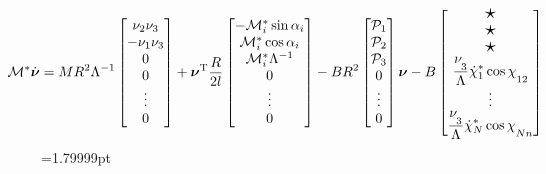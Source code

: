 \begin{eqnarray*}
    \hspace{-25pt}
    \M^*\dot{\vnu} = 
    MR^2\Lambda^{-1}\begin{bmatrix}
        \nu_2\nu_3\\
        -\nu_1\nu_3\\
        0\\
        0\\
        \vdots
        \\
        0
    \end{bmatrix}
    +\vnu^\mathrm{T}
    \frac{R}{2l}
    \begin{bmatrix}
        -\M^*_i \sin\alpha_i\\
        \M^*_i \cos\alpha_i\\
        \M^*_i \Lambda^{-1}\\
        0\\
        \vdots
        \\
        0
    \end{bmatrix}
    -BR^2
    \begin{bmatrix}
        \Prhs_1\\
        \Prhs_2\\
        \Prhs_3\\
        0\\
        \vdots
        \\
        0
    \end{bmatrix}
    \vnu
    -B\begin{bmatrix}
        \scalebox{1.5}{$\star$}\\
        \scalebox{1.5}{$\star$}\\
        \scalebox{1.5}{$\star$}\\
        \fontdimen16\textfont2=5pt
        \ddfrac{\nu_3}{\Lambda}\dot{\chi}_1^*\cos\chi_{12}\\
        \vdots
        \\
        \ddfrac{\nu_3}{\Lambda}\dot{\chi}_N^*\cos\chi_{Nn}
    \end{bmatrix}
\end{eqnarray*}
\begin{equation}\label{eq:full_system}
\end{equation}
=1.79999pt
